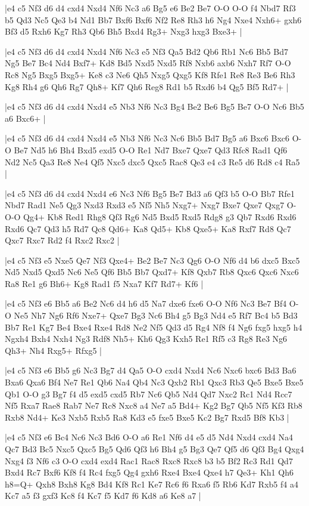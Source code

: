 \whitename{}
\blackname{}
\makegametitle
|e4 c5 Nf3 d6 d4 cxd4 Nxd4 Nf6 Nc3 a6 Bg5 e6 Be2 Be7 O-O O-O f4 Nbd7 Rf3 b5 Qd3 Nc5 Qe3 b4 Nd1 Bb7 Bxf6 Bxf6 Nf2 Re8 Rh3 h6 Ng4 Nxe4 Nxh6+ gxh6 Bf3 d5 Rxh6 Kg7 Rh3 Qb6 Bh5 Bxd4 Rg3+ Nxg3 hxg3 Bxe3+  |

\whitename{}
\blackname{}
\makegametitle
|e4 c5 Nf3 d6 d4 cxd4 Nxd4 Nf6 Nc3 e5 Nf3 Qa5 Bd2 Qb6 Rb1 Nc6 Bb5 Bd7 Ng5 Be7 Bc4 Nd4 Bxf7+ Kd8 Bd5 Nxd5 Nxd5 Rf8 Nxb6 axb6 Nxh7 Rf7 O-O Rc8 Ng5 Bxg5 Bxg5+ Ke8 c3 Ne6 Qh5 Nxg5 Qxg5 Kf8 Rfe1 Re8 Re3 Be6 Rh3 Kg8 Rh4 g6 Qh6 Rg7 Qh8+ Kf7 Qh6 Reg8 Rd1 b5 Rxd6 b4 Qg5 Bf5 Rd7+  |

\whitename{}
\blackname{}
\makegametitle
|e4 c5 Nf3 d6 d4 cxd4 Nxd4 e5 Nb3 Nf6 Nc3 Bg4 Be2 Be6 Bg5 Be7 O-O Nc6 Bb5 a6 Bxc6+  |

\whitename{}
\blackname{}
\makegametitle
|e4 c5 Nf3 d6 d4 cxd4 Nxd4 e5 Nb3 Nf6 Nc3 Nc6 Bb5 Bd7 Bg5 a6 Bxc6 Bxc6 O-O Be7 Nd5 h6 Bh4 Bxd5 exd5 O-O Re1 Nd7 Bxe7 Qxe7 Qd3 Rfc8 Rad1 Qf6 Nd2 Nc5 Qa3 Re8 Ne4 Qf5 Nxc5 dxc5 Qxc5 Rac8 Qe3 e4 c3 Re5 d6 Rd8 c4 Ra5  |

\whitename{}
\blackname{}
\makegametitle
|e4 c5 Nf3 d6 d4 cxd4 Nxd4 e6 Nc3 Nf6 Bg5 Be7 Bd3 a6 Qf3 b5 O-O Bb7 Rfe1 Nbd7 Rad1 Ne5 Qg3 Nxd3 Rxd3 e5 Nf5 Nh5 Nxg7+ Nxg7 Bxe7 Qxe7 Qxg7 O-O-O Qg4+ Kb8 Red1 Rhg8 Qf3 Rg6 Nd5 Bxd5 Rxd5 Rdg8 g3 Qb7 Rxd6 Rxd6 Rxd6 Qc7 Qd3 h5 Rd7 Qc8 Qd6+ Ka8 Qd5+ Kb8 Qxe5+ Ka8 Rxf7 Rd8 Qc7 Qxc7 Rxc7 Rd2 f4 Rxc2 Rxc2  |

\whitename{}
\blackname{}
\makegametitle
|e4 c5 Nf3 e5 Nxe5 Qe7 Nf3 Qxe4+ Be2 Be7 Nc3 Qg6 O-O Nf6 d4 b6 dxc5 Bxc5 Nd5 Nxd5 Qxd5 Nc6 Ne5 Qf6 Bb5 Bb7 Qxd7+ Kf8 Qxb7 Rb8 Qxc6 Qxc6 Nxc6 Ra8 Re1 g6 Bh6+ Kg8 Rad1 f5 Nxa7 Kf7 Rd7+ Kf6  |

\whitename{}
\blackname{}
\makegametitle
|e4 c5 Nf3 e6 Bb5 a6 Be2 Nc6 d4 h6 d5 Na7 dxe6 fxe6 O-O Nf6 Nc3 Be7 Bf4 O-O Ne5 Nh7 Ng6 Rf6 Nxe7+ Qxe7 Bg3 Nc6 Bh4 g5 Bg3 Nd4 e5 Rf7 Bc4 b5 Bd3 Bb7 Re1 Kg7 Be4 Bxe4 Rxe4 Rd8 Ne2 Nf5 Qd3 d5 Rg4 Nf8 f4 Ng6 fxg5 hxg5 h4 Ngxh4 Bxh4 Nxh4 Ng3 Rdf8 Nh5+ Kh6 Qg3 Kxh5 Re1 Rf5 c3 Rg8 Re3 Ng6 Qh3+ Nh4 Rxg5+ Rfxg5  |

\whitename{}
\blackname{}
\makegametitle
|e4 c5 Nf3 e6 Bb5 g6 Nc3 Bg7 d4 Qa5 O-O cxd4 Nxd4 Nc6 Nxc6 bxc6 Bd3 Ba6 Bxa6 Qxa6 Bf4 Ne7 Re1 Qb6 Na4 Qb4 Nc3 Qxb2 Rb1 Qxc3 Rb3 Qe5 Bxe5 Bxe5 Qb1 O-O g3 Bg7 f4 d5 exd5 cxd5 Rb7 Nc6 Qb5 Nd4 Qd7 Nxc2 Rc1 Nd4 Rcc7 Nf5 Rxa7 Rae8 Rab7 Ne7 Rc8 Nxc8 a4 Ne7 a5 Bd4+ Kg2 Bg7 Qb5 Nf5 Kf3 Rb8 Rxb8 Nd4+ Ke3 Nxb5 Rxb5 Ra8 Kd3 e5 fxe5 Bxe5 Kc2 Bg7 Rxd5 Bf8 Kb3  |

\whitename{}
\blackname{}
\makegametitle
|e4 c5 Nf3 e6 Bc4 Nc6 Nc3 Bd6 O-O a6 Re1 Nf6 d4 e5 d5 Nd4 Nxd4 cxd4 Na4 Qc7 Bd3 Bc5 Nxc5 Qxc5 Bg5 Qd6 Qf3 h6 Bh4 g5 Bg3 Qe7 Qf5 d6 Qf3 Bg4 Qxg4 Nxg4 f3 Nf6 c3 O-O cxd4 exd4 Rac1 Rac8 Rxc8 Rxc8 b3 b5 Bf2 Rc3 Rd1 Qd7 Bxd4 Rc7 Bxf6 Kf8 f4 Rc4 fxg5 Qg4 gxh6 Rxe4 Bxe4 Qxe4 h7 Qe3+ Kh1 Qh6 h8=Q+ Qxh8 Bxh8 Kg8 Bd4 Kf8 Rc1 Ke7 Rc6 f6 Rxa6 f5 Rb6 Kd7 Rxb5 f4 a4 Kc7 a5 f3 gxf3 Kc8 f4 Kc7 f5 Kd7 f6 Kd8 a6 Ke8 a7  |

